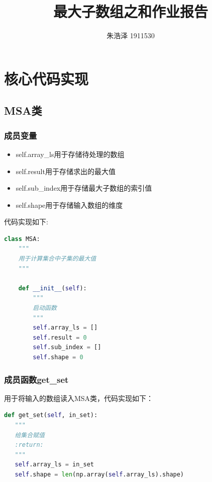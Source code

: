 \documentclass{article}
\begin{document}
\title{最大子数组之和作业报告}
\author{朱浩泽 1911530}
\maketitle
\section{核心代码实现}
\subsection{MSA类}
\subsubsection{成员变量}
\begin{itemize}
   \item self.array\_ls用于存储待处理的数组
   \item self.result用于存储求出的最大值
   \item self.sub\_index用于存储最大子数组的索引值
   \item self.shape用于存储输入数组的维度
\end{itemize}
代码实现如下:
\begin{lstlisting}[language = python]
class MSA:
    """
    用于计算集合中子集的最大值
    """

    def __init__(self):
        """
        启动函数
        """
        self.array_ls = []
        self.result = 0
        self.sub_index = []
        self.shape = 0
\end{lstlisting}
\subsubsection{成员函数get\_set}
用于将输入的数组读入MSA类，代码实现如下：
\begin{lstlisting}[language = python]
def get_set(self, in_set):
   """
   给集合赋值
   :return:
   """
   self.array_ls = in_set
   self.shape = len(np.array(self.array_ls).shape) 
\end{lstlisting}
\end{document}
